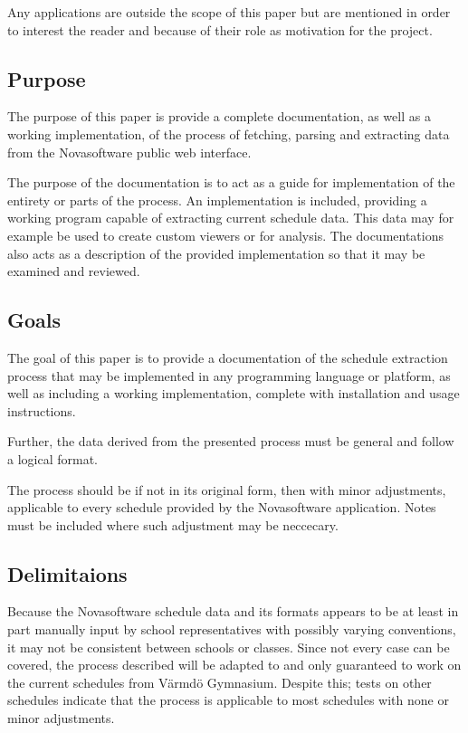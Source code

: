 \documentclass{article}
\begin{document}
	Any applications are outside the scope of this paper but are mentioned in order to interest the reader and because of their role as motivation for the project.
	
	\subsection{Purpose}
	The purpose of this paper is provide a complete documentation, as well as a working implementation, of the process of fetching, parsing and extracting data from the Novasoftware public web interface. 
	
	The purpose of the documentation is to act as a guide for implementation of the entirety or parts of the process. An implementation is included, providing a working program capable of extracting current schedule data. This data may for example be used to create custom viewers or for analysis. The documentations also acts as a description of the provided implementation so that it may be examined and reviewed.
	
	\subsection{Goals}
	The goal of this paper is to provide a documentation of the schedule extraction process that may be implemented in any programming language or platform, as well as including a working implementation, complete with installation and usage instructions.
	
	Further, the data derived from the presented process must be general and follow a logical format.
	
	The process should be if not in its original form, then with minor adjustments, applicable to every schedule provided by the Novasoftware application. Notes must be included where such adjustment may be neccecary.
	
	\subsection{Delimitaions}
	Because the Novasoftware schedule data and its formats appears to be at least in part manually input by school representatives with possibly varying conventions, it may not be consistent between schools or classes. Since not every case can be covered, the process described will be adapted to and only guaranteed to work on the current schedules from Värmdö Gymnasium. Despite this; tests on other schedules indicate that the process is applicable to most schedules with none or minor adjustments.
	
\end{document}
